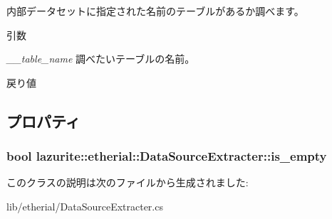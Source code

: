 内部データセットに指定された名前のテーブルがあるか調べます。 
\begin{DoxyParams}{引数}
\item[{\em \_\-\_\-table\_\-name}]調べたいテーブルの名前。\end{DoxyParams}
\begin{DoxyReturn}{戻り値}

\end{DoxyReturn}


\subsection{プロパティ}
\hypertarget{classlazurite_1_1etherial_1_1_data_source_extracter_aa3ab61131fb4520545ca1298b37cbb8d}{
\subsubsection[{is\_\-empty}]{\setlength{\rightskip}{0pt plus 5cm}bool lazurite::etherial::DataSourceExtracter::is\_\-empty}}
\label{classlazurite_1_1etherial_1_1_data_source_extracter_aa3ab61131fb4520545ca1298b37cbb8d}


このクラスの説明は次のファイルから生成されました:\begin{DoxyCompactItemize}
\item 
lib/etherial/DataSourceExtracter.cs\end{DoxyCompactItemize}
